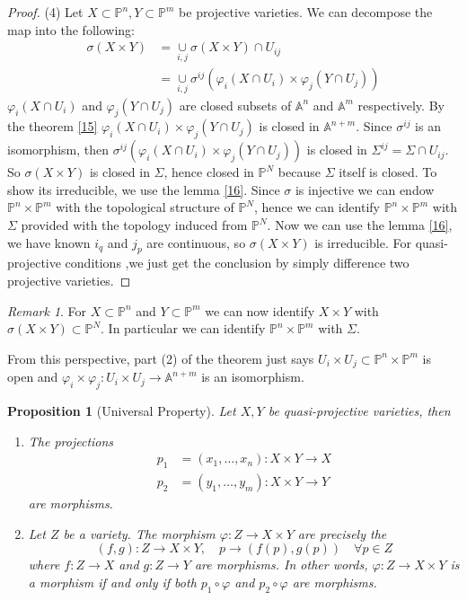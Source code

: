 \documentclass{amsart}
\theoremstyle{plain}
\newtheorem{proposition}{Proposition}
\theoremstyle{definition}
\theoremstyle{remark}
\newtheorem*{remark}{Remark}
\numberwithin{equation}{section}
\begin{document}
\begin{proof}
	(4) Let $ X\subset \mathbb{P}^n,Y\subset \mathbb{P}^m $ be projective varieties. We can decompose the map into the following:
	\begin{align*}
		\sigma(X\times Y) &=\mathop{\cup}\limits_{i,j}\sigma(X\times Y)\cap U_{ij}\\
		&=\mathop{\cup}\limits_{i,j}\sigma^{ij}(\varphi_i(X\cap{U_i})\times \varphi_j(Y\cap{U_j}))
	\end{align*}
	$ \varphi_i(X\cap U_i) $ and $ \varphi_j(Y\cap U_j) $ are closed subsets of $ \mathbb{A}^n $ and $ \mathbb{A}^m $ respectively. By the theorem \ref{15} $ \varphi_i(X\cap{U_i})\times \varphi_j(Y\cap{U_j}) $ is closed in $ \mathbb{A}^{n+m} $. Since $ \sigma^{ij} $ is an isomorphism, then  $ \sigma^{ij}(\varphi_i(X\cap{U_i})\times \varphi_j(Y\cap{U_j})) $ is closed in $ \Sigma^{ij}=\Sigma\cap U_{ij}$. So $ \sigma(X\times Y) $ is closed in $ \Sigma $, hence closed in $ \mathbb{P}^N $ because $ \Sigma $ itself is closed. To show its irreducible, we use the lemma \ref{16}. Since $ \sigma $ is injective we can endow $ \mathbb{P}^n\times\mathbb{P}^m $ with the topological structure of $ \mathbb{P}^N $, hence we can identify $ \mathbb{P}^n\times\mathbb{P}^m $ with $ \Sigma $ provided with the topology induced from $ \mathbb{P}^N $. Now we can use the lemma \ref{16}, we have known $ i_q $ and $ j_p $ are continuous, so $ \sigma(X\times Y) $ is irreducible. For quasi-projective conditions ,we just get the conclusion by simply difference two projective varieties.
\end{proof}
\begin{remark}
For $ X\subset \mathbb{P}^n $ and $ Y\subset\mathbb{P}^m $ we can now identify $ X\times Y $ with $ \sigma(X\times Y)\subset \mathbb{P}^N$. In particular we can identify $ \mathbb{P}^n\times\mathbb{P}^m $ with $ \Sigma $.

From this perspective, part (2) of the theorem just says $ U_i\times U_j\subset \mathbb{P}^n\times \mathbb{P}^m $ is open and $ \varphi_i\times \varphi_j:U_i\times U_j\to \mathbb{A}^{n+m} $ is an isomorphism. 
\end{remark}
\begin{proposition}[Universal Property]
	Let $ X,Y $ be quasi-projective varieties, then 
	\begin{enumerate}
		\item The projections
			\begin{align*}
			p_1 & =(x_1,\dots,x_n): X\times Y\to X\\
			p_2 & =(y_1,\dots,y_m): X\times Y\to Y
			\end{align*}
			are morphisms.
		\item Let $ Z $ be a variety. The morphism $ \varphi : Z\to X \times Y $ are precisely the 
		\begin{equation*}
		(f,g):Z\to X\times Y,\quad p\to (f(p),g(p))\quad\forall p\in Z
		\end{equation*}
		where $ f:Z\to X $ and $ g:Z\to Y $ are morphisms. In other words, $ \varphi:Z\to X\times Y $ is a morphism if and only if both $ p_1\circ \varphi $ and $ p_2\circ\varphi  $ are morphisms.
	\end{enumerate}
\end{proposition}
\end{document}
